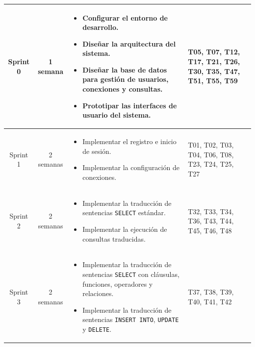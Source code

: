 \begin{longtable}[c]{|c|c|m{}|m{}|}
    Sprint 0 & 1 semana & \begin{itemize}[nosep, leftmargin=0.7cm, before=\vspace{0.5em}, after=\vspace{0.5em}]
        \item Configurar el entorno de desarrollo.
        \item Diseñar la arquitectura del sistema.
        \item Diseñar la base de datos para gestión de usuarios, conexiones y consultas.
        \item Prototipar las interfaces de usuario del sistema.
    \end{itemize} & T05, T07, T12, T17, T21, T26, T30, T35, T47, T51, T55, T59 \\
    \hline
    Sprint 1 & 2 semanas & \begin{itemize}[nosep, leftmargin=0.7cm, before=\vspace{0.5em}, after=\vspace{0.5em}]
        \item Implementar el registro e inicio de sesión.
        \item Implementar la configuración de conexiones.
    \end{itemize} & T01, T02, T03, T04, T06, T08, T23, T24, T25, T27 \\
    \hline
    Sprint 2 & 2 semanas & \begin{itemize}[nosep, leftmargin=0.7cm, before=\vspace{0.5em}, after=\vspace{0.5em}]
        \item Implementar la traducción de sentencias \texttt{SELECT} estándar.
        \item Implementar la ejecución de consultas traducidas.
    \end{itemize} & T32, T33, T34, T36, T43, T44, T45, T46, T48 \\
    \hline
    Sprint 3 & 2 semanas & \begin{itemize}[nosep, leftmargin=0.7cm, before=\vspace{0.5em}, after=\vspace{0.5em}]
        \item Implementar la traducción de sentencias \texttt{SELECT} con cláusulas, funciones, operadores y relaciones.
        \item Implementar la traducción de sentencias \texttt{INSERT INTO}, \texttt{UPDATE} y \texttt{DELETE}.
    \end{itemize} & T37, T38, T39, T40, T41, T42 \\

\end{longtable}
